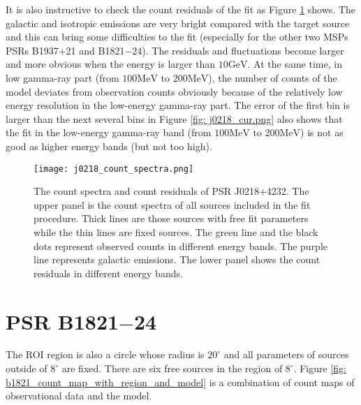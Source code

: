 \documentclass[a4paper, 12pt]{report}
\begin{document}
      It is also instructive to check the count residuals of the fit as Figure 
      \ref{fig: j0218_count_spectra} shows. The galactic and isotropic emissions are very 
      bright compared with the target source and this can bring some difficulties to 
      the fit (especially for the other two MSPs PSRs B1937+21 and B1821$-$24). The residuals 
      and fluctuations become larger and more obvious when the energy is larger than 
      $10\mbox{GeV}$. At the same time, in low gamma-ray part 
      (from $100\mbox{MeV}$ to $200\mbox{MeV}$), the number of counts of the model 
      deviates from observation counts obviously because of the relatively low energy 
      resolution in the low-energy gamma-ray part. The error of the first bin is larger
      than the next several bins in Figure \ref{fig: j0218_cur.png} also shows that 
      the fit in the low-energy gamma-ray band (from $100\mbox{MeV}$ to $200\mbox{MeV}$) 
      is not as good as higher energy bands (but not too high). 
            
      \begin{figure}[!htp]
        \centering
        \texttt{[image: j0218\_count\_spectra.png]}
        \caption[The count spectra and count residuals of PSR J0218+4232.]
                {The count spectra and count residuals of PSR J0218+4232.
                The upper panel is the count spectra of all sources included in the 
                fit procedure. Thick lines are those sources with free fit parameters 
                while the thin lines are fixed sources. The green line and the black 
                dots represent observed counts in different energy bands. The purple 
                line represents galactic emissions. The lower panel shows the count 
                residuals in different energy bands. } 
        \label{fig: j0218_count_spectra}
      \end{figure}

  \section{PSR B1821$-$24}
    The ROI region is also a circle whose radius is $20^\circ$ and all 
    parameters of sources outside of $8^\circ$ are fixed. 
    There are six free sources in the region of $8^\circ$. Figure
    \ref{fig: b1821_count_map_with_region_and_model} 
    is a combination of count maps of observational data and the model. 
\end{document}
